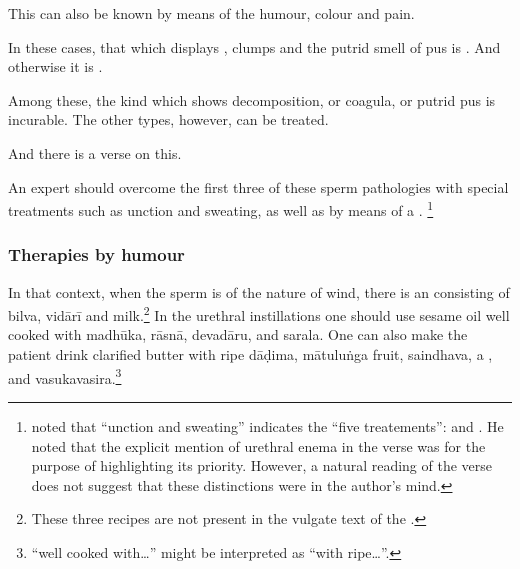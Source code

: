 \begin{translation}
 This can also be known by means of the humour, colour and pain.
 
 In these cases, that which displays , clumps 
 and the putrid smell of pus is . And otherwise it is 
 .
 
 
  Among these, the kind which shows decomposition, or coagula, or 
  putrid pus is incurable. The other types, however, can be treated.  
 
 \item[6]
 
 And there is a verse on this. 
 
 \begin{sloka}
      An expert should overcome the first three of these sperm
pathologies with special
treatments such as unction and sweating,
as well as by means of a .\label{uttarabastyantam}%
\footnote{ noted that “unction and sweating”
    indicates the “five treatements”:  and .  He noted that the explicit mention
    of urethral enema in the verse was for the purpose of highlighting its
    priority. However, a natural reading of the verse does not suggest
    that these distinctions were in the author's mind.}
    
 \end{sloka}
 
 \subsubsection{Therapies by humour}
 
 \item[6.1] 
 
In that context, when the sperm is of the nature of wind, there is an
 consisting of \gls{bilva}, \gls{vidārī} and
milk.\footnote{These three recipes are not present in the vulgate text
    of the \SS.} %
    In the urethral
    instillations one should use sesame oil well cooked with \gls{madhūka},
    \gls{rāsnā}, \gls{devadāru}, and \gls{sarala}. One can also make
    the patient drink clarified butter with ripe \gls{dāḍima},
    \gls{mātuluṅga} fruit, \gls{saindhava}, a ,
    and \gls{vasukavasira}.\footnote{ “well cooked with\ldots” 
    might be interpreted as “with ripe\ldots”.}
 

\end{translation}
